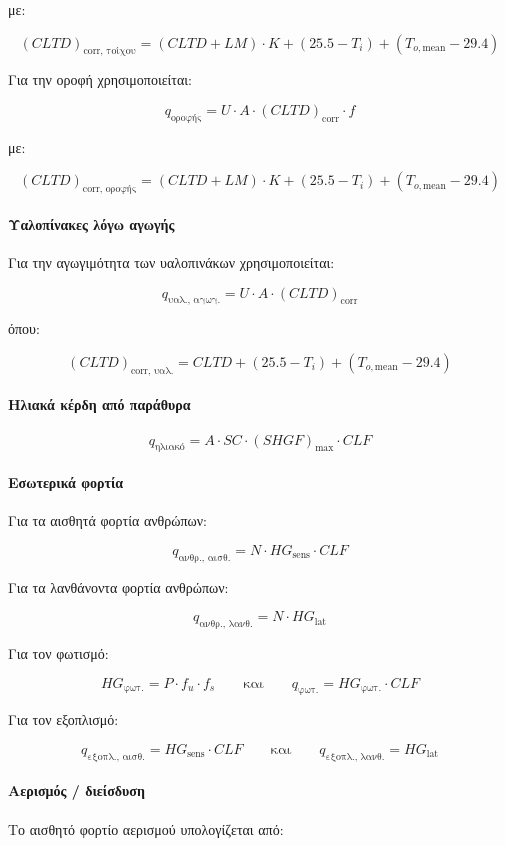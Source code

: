 \documentclass[12pt,a4paper]{article}
\begin{document}
με:

\[
(CLTD)_{\text{corr, τοίχου}} =
(CLTD + LM)\cdot K + (25.5 - T_i) + (T_{o,\mathrm{mean}} - 29.4)
\]

Για την οροφή χρησιμοποιείται:

\[
q_{\text{οροφής}} = U \cdot A \cdot (CLTD)_{\text{corr}} \cdot f
\]

με:

\[
(CLTD)_{\text{corr, οροφής}} =
(CLTD + LM)\cdot K + (25.5 - T_i) + (T_{o,\mathrm{mean}} - 29.4)
\]

\paragraph{Υαλοπίνακες λόγω αγωγής}
Για την αγωγιμότητα των υαλοπινάκων χρησιμοποιείται:

\[
q_{\text{υαλ., αγωγ.}} = U \cdot A \cdot (CLTD)_{\text{corr}}
\]

όπου:

\[
(CLTD)_{\text{corr, υαλ.}} = CLTD + (25.5 - T_i) + (T_{o,\mathrm{mean}} - 29.4)
\]

\paragraph{Ηλιακά κέρδη από παράθυρα}

\[
q_{\text{ηλιακό}} = A \cdot SC \cdot (SHGF)_{\max} \cdot CLF
\]

\paragraph{Εσωτερικά φορτία}
Για τα αισθητά φορτία ανθρώπων:

\[
q_{\text{ανθρ., αισθ.}} = N \cdot HG_{\text{sens}} \cdot CLF
\]

Για τα λανθάνοντα φορτία ανθρώπων:

\[
q_{\text{ανθρ., λανθ.}} = N \cdot HG_{\text{lat}}
\]

Για τον φωτισμό:

\[
HG_{\text{φωτ.}} = P \cdot f_u \cdot f_s
\qquad \text{και} \qquad
q_{\text{φωτ.}} = HG_{\text{φωτ.}} \cdot CLF
\]

Για τον εξοπλισμό:

\[
q_{\text{εξοπλ., αισθ.}} = HG_{\text{sens}} \cdot CLF
\qquad \text{και} \qquad
q_{\text{εξοπλ., λανθ.}} = HG_{\text{lat}}
\]

\paragraph{Αερισμός / διείσδυση}
Το αισθητό φορτίο αερισμού υπολογίζεται από:
\end{document}
